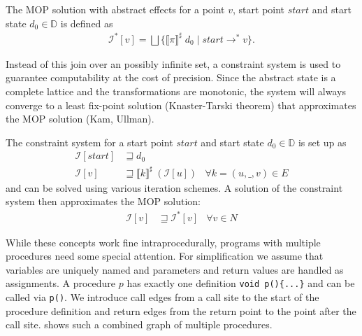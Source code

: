 The MOP solution with abstract effects for a point $v$, start point $start$ and start state $d_0 \in \mathbb{D}$ is defined as
\begin{align}
\mathcal{I}^*[v] = \bigsqcup \{\llbracket \pi \rrbracket^\sharp \; d_0 \; | \; start \to^* v\}.
\end{align}

Instead of this join over an possibly infinite set, a constraint system is used to guarantee computability at the cost of precision. Since the abstract state is a complete lattice and the transformations are monotonic, the system will always converge to a least fix-point solution (Knaster-Tarski theorem) that approximates the MOP solution (Kam, Ullman).

The constraint system for a start point $start$ and start state $d_0 \in \mathbb{D}$ is set up as
\begin{align}
\mathcal{I}[start] &\sqsupseteq d_0\\
\mathcal{I}[v]	   &\sqsupseteq \llbracket k \rrbracket^\sharp \; (\mathcal{I}[u])	&\forall k = (u, \_, v) \in E
\end{align}
and can be solved using various iteration schemes.
A solution of the constraint system then approximates the MOP solution:
\begin{align}
\mathcal{I}[v]	   &\sqsupseteq \mathcal{I}^*[v] &\forall v \in N
\end{align}

While these concepts work fine intraprocedurally, programs with multiple procedures need some special attention.
For simplification we assume that variables are uniquely named and parameters and return values are handled as assignments.
A procedure $p$ has exactly one definition \verb|void p(){...}| and can be called via \verb|p()|.
We introduce call edges from a call site to the start of the procedure definition and return edges from the return point to the point after the call site.
 shows such a combined graph of multiple procedures.

